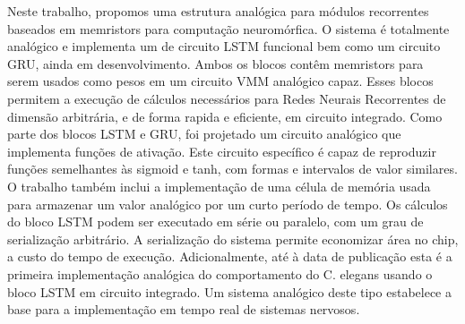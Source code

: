 \begin{resumo}

  Neste trabalho, propomos uma estrutura anal\'{o}gica para m\'{o}dulos recorrentes baseados em memristors para computa\c{c}\~{a}o neurom\'{o}rfica. O sistema \'{e} totalmente anal\'{o}gico e implementa um de circuito \acs{LSTM} funcional bem como um circuito GRU, ainda em desenvolvimento. Ambos os blocos cont\^{e}m memristors para serem usados como pesos em um circuito VMM anal\'{o}gico capaz. Esses blocos permitem a execu\c{c}\~{a}o de c\'{a}lculos necess\'{a}rios para Redes Neurais Recorrentes de dimens\~{a}o arbitr\'{a}ria, e de forma rapida e eficiente, em circuito integrado. Como parte dos blocos \ac{LSTM} e \ac{GRU}, foi projetado um circuito anal\'{o}gico que implementa fun\c{c}\~{o}es de ativa\c{c}\~{a}o. Este circuito espec\'{i}fico \'{e} capaz de reproduzir fun\c{c}\~{o}es semelhantes \`{a}s sigmoid e tanh, com formas e intervalos de valor similares. O trabalho tamb\'{e}m inclui a implementa\c{c}\~{a}o de uma c\'{e}lula de mem\'{o}ria usada para armazenar um valor anal\'{o}gico por um curto per\'{i}odo de tempo. Os c\'{a}lculos do bloco LSTM podem ser executado em s\'{e}rie ou paralelo, com um grau de serializa\c{c}\~{a}o arbitr\'{a}rio. A serializa\c{c}\~{a}o do sistema permite economizar \'{a}rea no chip, a custo do tempo de execu\c{c}\~{a}o. Adicionalmente, at\'{e} \`{a} data de publica\c{c}\~{a}o esta \'{e} a primeira implementa\c{c}\~{a}o anal\'{o}gica do comportamento do \ac{C. elegans} usando o bloco \ac{LSTM} em circuito integrado. Um sistema anal\'{o}gico deste tipo estabelece a base para a implementa\c{c}\~{a}o em tempo real de sistemas nervosos.

\end{resumo}
